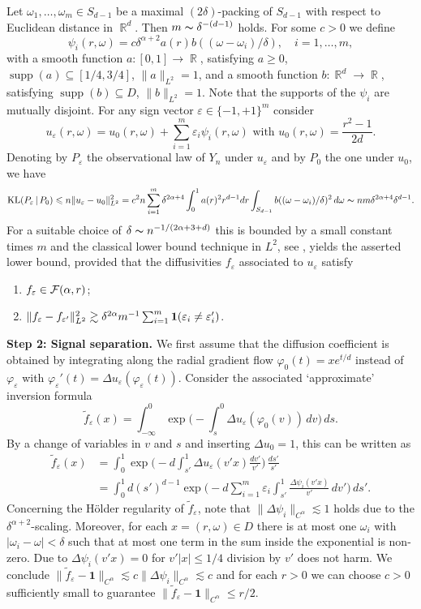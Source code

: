 \documentclass{article}
\numberwithin{equation}{section}
\theoremstyle{definition}
\DeclareMathOperator{\R}{{\mathbb R}}
\DeclareMathOperator{\supp}{supp} \DeclareMathOperator{\im}{im}
\providecommand{\eps}{\varepsilon}
\renewcommand{\phi}{\varphi}
\renewcommand{\subset}{\subseteq}
\providecommand{\abs}[1]{\lvert #1 \rvert}
\providecommand{\norm}[1]{\lVert #1 \rVert}
\renewcommand{\le}{\leqslant}
\renewcommand{\ge}{\geqslant}
\begin{document}
Let $\omega_1,\ldots,\omega_m\in S_{d-1}$ be a maximal $(2\delta)$-packing of $S_{d-1}$ with respect to Euclidean distance in $\R^d$. Then $m\thicksim \delta^{-(d-1)}$ holds. For some $c>0$ we define
\[ \psi_i(r,\omega)=c\delta^{\alpha+2}a(r)b((\omega-\omega_i)/\delta),\quad i=1,\ldots,m,\]
with a smooth function $a:[0,1]\to\R$, satisfying $a\ge 0$, $\supp(a)\subset[1/4,3/4]$, $\norm{a}_{L^2}=1$, and a smooth function $b:\R^d\to\R$, satisfying  $\supp(b)\subseteq D$, $\norm{b}_{L^2}=1$. Note that the supports of the $\psi_i$ are mutually disjoint. For any sign vector $\eps\in\{-1,+1\}^m$ consider
\[ u_\eps(r,\omega)=u_0(r,\omega)+\sum_{i=1}^m\eps_i\psi_i(r,\omega) \text{ with } u_0(r,\omega)=\frac{r^2-1}{2d}.\]
Denoting by $P_\eps$ the observational law of $Y_n$ under $u_\eps$ and by $P_0$ the one under $u_0$, we have 
\[ \KL(P_\eps\,|\,P_0)\le n \norm{u_\eps-u_0}_{L^2}^2=c^2n\sum_{i=1}^m \delta^{2\alpha+4}\int_0^1a(r)^2r^{d-1}dr \int_{S_{d-1}}b((\omega-\omega_i)/\delta)^2\,d\omega
\thicksim nm\delta^{2\alpha+4}\delta^{d-1}.\]
For a suitable choice of $\delta\thicksim n^{-1/(2\alpha+3+d)}$ this is bounded by a small constant times $m$ and the classical lower bound technique in $L^2$, see \cite{tsybakov2003introduction}, yields the asserted lower bound, provided that the diffusivities $f_\eps$ associated to $u_\eps$ satisfy
\begin{enumerate}
\item $f_\eps\in {\cal F}(\alpha,r)$;
\item $\norm{f_\eps-f_{\eps'}}_{L^2}^2\gtrsim \delta^{2\alpha}m^{-1}\sum_{i=1}^m {\bf 1}(\eps_i\not=\eps_i')$.
\end{enumerate}

\textbf{Step 2: Signal separation.} 
We first assume that the diffusion coefficient is obtained by integrating along the radial gradient flow $\phi_0(t)=xe^{t/d}$ instead of $\phi_\eps$ with $\phi_\eps'(t)=\Delta u_\eps(\phi_\eps(t))$. Consider the associated `approximate' inversion formula
\[ \tilde f_\eps(x)=\int_{-\infty}^0\exp\Big(-\int_s^0 \Delta u_\eps(\phi_0(v))\,dv\Big)\,ds.
\]
By a change of variables in $v$ and $s$ and inserting $\Delta u_0=1$, this can be written as
\begin{align*}
\tilde f_\eps(x)&=\int_0^1 \exp\Big(-d\int_{s'}^1 \Delta u_\eps(v'x)\frac{dv'}{v'}\Big)\,\frac{ds'}{s'}\\
&=\int_0^1 d(s')^{d-1}\exp\Big(-d\sum_{i=1}^m\eps_i\int_{s'}^1 \frac{\Delta \psi_i(v'x)}{v'}\, dv'\Big)\,ds'.
\end{align*}
Concerning the H\"older regularity of $\tilde f_\eps$, note that $\norm{\Delta \psi_i}_{C^\alpha}\lesssim 1$ holds due to the $\delta^{\alpha+2}$-scaling. Moreover, for each $x=(r,\omega)\in D$ there is at most one $\omega_i$ with $\abs{\omega_i-\omega}<\delta$ such that at most one term in the sum inside the exponential is non-zero. Due to $\Delta \psi_i(v'x)=0$ for $v'\abs{x}\le 1/4$ division by $v'$ does not harm. We conclude $\norm{\tilde f_\eps-\mathbf 1}_{C^\alpha}\lesssim c\norm{\Delta \psi_i}_{C^\alpha}\lesssim c$ and for each $r>0$ we can choose $c>0$ sufficiently small to  guarantee $\norm{\tilde f_\eps-\mathbf 1}_{C^\alpha}\le r/2$.
\end{document}
